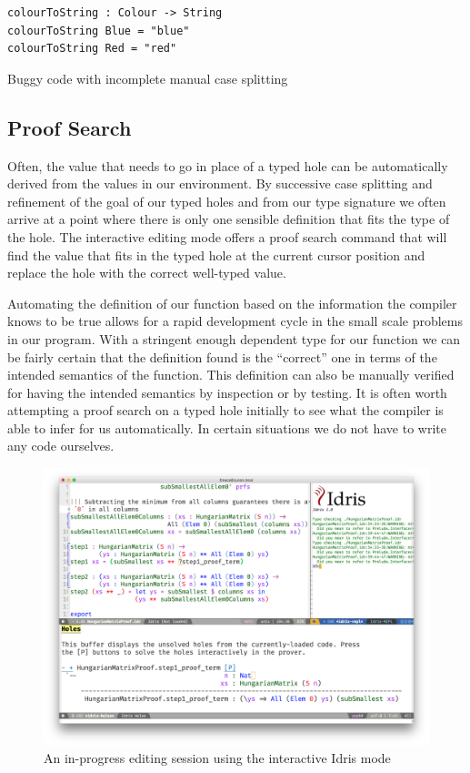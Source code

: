 \documentclass[a4paper, notitlepage]{report}
\begin{document}
\begin{listing}[H]
\begin{verbatim}
colourToString : Colour -> String
colourToString Blue = "blue"
colourToString Red = "red"
\end{verbatim}
\caption{Buggy code with incomplete manual case splitting}
\end{listing}

\subsection{Proof Search}
\label{sec:org9ed7f8e}
Often, the value that needs to go in place of a typed hole can be automatically
derived from the values in our environment. By successive case splitting and
refinement of the goal of our typed holes and from our type signature we often
arrive at a point where there is only one sensible definition that fits the type
of the hole. The interactive editing mode offers a proof search command that
will find the value that fits in the typed hole at the current cursor position
and replace the hole with the correct well-typed value.

Automating the definition of our function based on the information the compiler
knows to be true allows for a rapid development cycle in the small scale
problems in our program. With a stringent enough dependent type for our function
we can be fairly certain that the definition found is the ``correct'' one in
terms of the intended semantics of the function. This definition can also be
manually verified for having the intended semantics by inspection or by testing.
It is often worth attempting a proof search on a typed hole initially to see
what the compiler is able to infer for us automatically. In certain situations
we do not have to write any code ourselves.

\begin{figure}[H]
\centering
\includegraphics[width=0.85\linewidth]{./fig/interactive_idris.png}
\caption{An in-progress editing session using the interactive Idris mode}
\end{figure}
\end{document}
